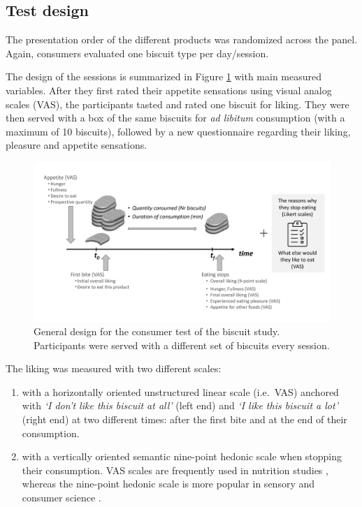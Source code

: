 \documentclass[
]{krantz}
\providecommand{\tightlist}{%
  \setlength{\itemsep}{0pt}\setlength{\parskip}{0pt}}
\begin{document}
\hypertarget{test-design}{%
\subsection{Test design}\label{test-design}}

The presentation order of the different products was randomized across the panel. Again, consumers evaluated one biscuit type per day/session.

The design of the sessions is summarized in Figure \ref{fig:test-design} with main measured variables. After they first rated their appetite sensations using visual analog scales (VAS), the participants tasted and rated one biscuit for liking. They were then served with a box of the same biscuits for \emph{ad libitum} consumption (with a maximum of 10 biscuits), followed by a new questionnaire regarding their liking, pleasure and appetite sensations.

\begin{figure}

{\centering \includegraphics[width=0.9\linewidth]{images/consumer_test_design} 

}

\caption{General design for the consumer test of the biscuit study. Participants were served with a different set of biscuits every session.}\label{fig:test-design}
\end{figure}

The liking was measured with two different scales:

\begin{enumerate}
\def\labelenumi{\arabic{enumi}.}
\tightlist
\item
  with a horizontally oriented unstructured linear scale (i.e.~VAS) anchored with \emph{`I don't like this biscuit at all'} (left end) and \emph{`I like this biscuit a lot'} (right end) at two different times: after the first bite and at the end of their consumption.
\item
  with a vertically oriented semantic nine-point hedonic scale when stopping their consumption.
  VAS scales are frequently used in nutrition studies \citep{stubbs2000}, whereas the nine-point hedonic scale is more popular in sensory and consumer science \citep{peryam1957, wichchukit2015}.
\end{enumerate}
\end{document}
